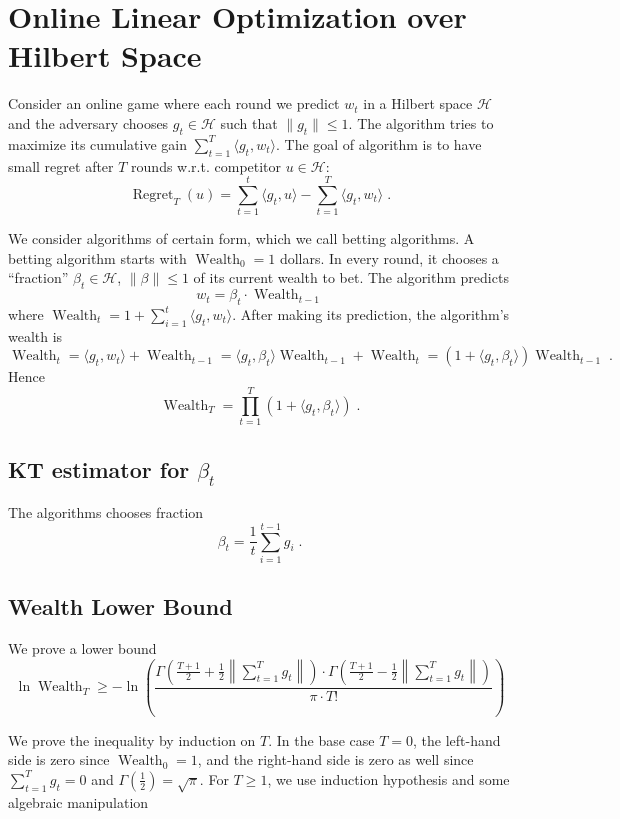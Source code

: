 \documentclass{article}
\DeclareMathOperator{\Regret}{Regret}
\DeclareMathOperator{\Wealth}{Wealth}
\renewcommand{\H}{\mathcal{H}}
\begin{document}
\section{Online Linear Optimization over Hilbert Space}
\label{section:online-linear-optimization-hilbert-space}

Consider an online game where each round we predict $w_t$ in a Hilbert space $\H$
and the adversary chooses $g_t \in \H$ such that $\|g_t\| \le 1$.
The algorithm tries to maximize its cumulative gain $\sum_{t=1}^T \langle g_t, w_t \rangle$.
The goal of algorithm is to have small regret after $T$ rounds w.r.t. competitor $u \in \H$:
$$
\Regret_T(u) = \sum_{t=1}^t \langle g_t, u \rangle - \sum_{t=1}^T \langle g_t, w_t \rangle \; .
$$

We consider algorithms of certain form, which we call betting algorithms.  A
betting algorithm starts with $\Wealth_0 = 1$ dollars.
In every round, it chooses a ``fraction'' $\beta_t \in \H$, $\|\beta\| \le 1$
of its current wealth to bet. The algorithm predicts
$$
w_t = \beta_t \cdot \Wealth_{t-1}
$$
where $\Wealth_t = 1 + \sum_{i=1}^t \langle g_t, w_t \rangle$. After making its prediction,
the algorithm's wealth is
$$
\Wealth_t = \langle g_t, w_t \rangle + \Wealth_{t-1} = \langle g_t, \beta_t \rangle \Wealth_{t-1} + \Wealth_t = (1 + \langle g_t, \beta_t \rangle) \Wealth_{t-1} \; .
$$
Hence
$$
\Wealth_T = \prod_{t=1}^T (1 + \langle g_t, \beta_t \rangle) \; .
$$

\subsection{KT estimator for $\beta_t$}

The algorithms chooses fraction
$$
\beta_t = \frac{1}{t} \sum_{i=1}^{t-1} g_i \; .
$$

\subsection{Wealth Lower Bound}

We prove a lower bound
$$
\ln \Wealth_T
\ge - \ln\left(
\frac{\Gamma \left(\frac{T+1}{2} + \frac{1}{2}\left\|\sum_{t=1}^T g_t \right\| \right) \cdot \Gamma \left(\frac{T+1}{2} - \frac{1}{2} \left\|\sum_{t=1}^T g_t \right\| \right)}{\pi \cdot T!}
\right)
$$

We prove the inequality by induction on $T$. In the base case $T=0$, the
left-hand side is zero since $\Wealth_0 = 1$, and the right-hand side is zero
as well since $\sum_{t=1}^T g_t = 0$ and $\Gamma(\frac{1}{2}) = \sqrt{\pi}$.
For $T \ge 1$, we use induction hypothesis and some algebraic manipulation
\end{document}
